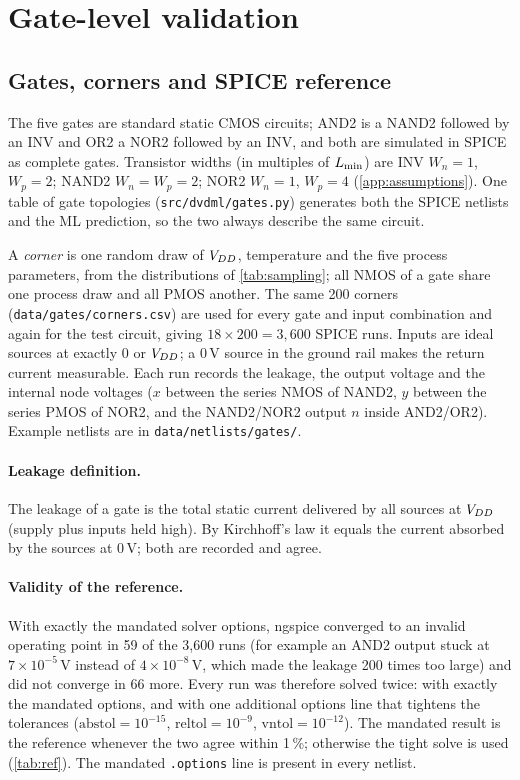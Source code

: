 \section{Gate-level validation}\label{sec:gates}

\subsection{Gates, corners and SPICE reference}
The five gates are standard static CMOS circuits; AND2 is a NAND2 followed by an INV and OR2 a NOR2 followed by an INV, and both are simulated in
SPICE as complete gates. Transistor widths (in multiples of $L_{\min}$) are INV $W_n=1$, $W_p=2$; NAND2 $W_n=W_p=2$; NOR2 $W_n=1$, $W_p=4$
(\cref{app:assumptions}). One table of gate topologies (\texttt{src/dvdml/gates.py}) generates both the SPICE netlists and the ML prediction,
so the two always describe the same circuit.

A \emph{corner} is one random draw of $V_{DD}$, temperature and the five process parameters, from the distributions of \cref{tab:sampling}; all NMOS of
a gate share one process draw and all PMOS another. The same 200 corners (\texttt{data/gates/corners.csv}) are used for every gate and input
combination and again for the test circuit, giving $18\times200=3{,}600$ SPICE runs. Inputs are ideal sources at exactly $0$ or $V_{DD}$; a 0\,V source
in the ground rail makes the return current measurable. Each run records the leakage, the output voltage and the internal node voltages ($x$ between the
series NMOS of NAND2, $y$ between the series PMOS of NOR2, and the NAND2/NOR2 output $n$ inside AND2/OR2). Example netlists are in \texttt{data/netlists/gates/}.

\paragraph{Leakage definition.} The leakage of a gate is the total static current delivered by all sources at $V_{DD}$ (supply plus inputs held high).
By Kirchhoff's law it equals the current absorbed by the sources at $0$\,V; both are recorded and agree.

\paragraph{Validity of the reference.} With exactly the mandated solver options, ngspice converged to an invalid operating point in 59 of the 3{,}600
runs (for example an AND2 output stuck at $7\times10^{-5}$\,V instead of $4\times10^{-8}$\,V, which made the leakage 200 times too large) and did not
converge in 66 more. Every run was therefore solved twice: with exactly the mandated options, and with one additional options line that tightens the
tolerances ($\mathrm{abstol}=10^{-15}$, $\mathrm{reltol}=10^{-9}$, $\mathrm{vntol}=10^{-12}$). The mandated result is the reference whenever the two agree within
1\,\%; otherwise the tight solve is used (\cref{tab:ref}). The mandated \texttt{.options} line is present in every netlist.


